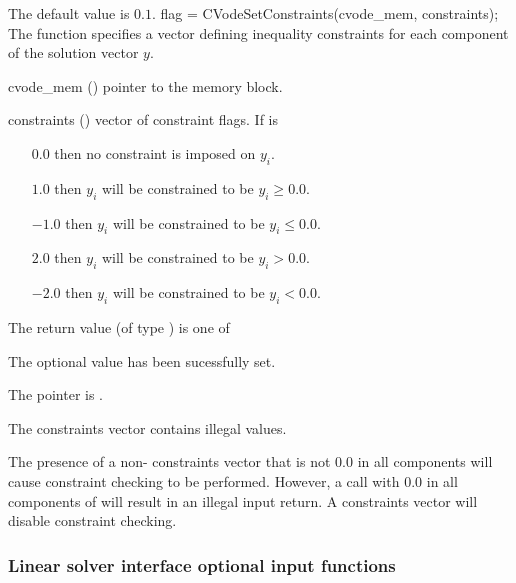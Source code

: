 {
  The default value is $0.1$.
}
{
flag = CVodeSetConstraints(cvode\_mem, constraints);
}
{
  The function  specifies a vector defining
  inequality constraints for each component of the solution vector $y$.
}
{
  \begin{args}
  \item[cvode\_mem] ()
    pointer to the {\cvode} memory block.
  \item[constraints] ()
    vector of constraint flags. If  is
    \begin{itemize}
    \item[$0.0$] then no constraint is imposed on $y_i$.
    \item[$1.0$] then $y_i$ will be constrained to be $y_i \ge 0.0$.
    \item[$-1.0$] then $y_i$ will be constrained to be $y_i \le 0.0$.
    \item[$2.0$] then $y_i$ will be constrained to be $y_i > 0.0$.
    \item[$-2.0$] then $y_i$ will be constrained to be $y_i < 0.0$.
    \end{itemize}
  \end{args}
}
{
  The return value  (of type ) is one of 
  \begin{args}
  \item[\Id{CV\_SUCCESS}]
    The optional value has been sucessfully set.
  \item[\Id{CV\_MEM\_NULL}]
    The  pointer is .
  \item[\Id{CV\_ILL\_INPUT}]
    The constraints vector contains illegal values.
  \end{args}
}
{
  The presence of a non- constraints vector that is not $0.0$ in
  all components will cause constraint checking to be performed.
  However, a call with $0.0$ in all components of  will
  result in an illegal input return. A  constraints vector will disable
  constraint checking.
}

\subsubsection{Linear solver interface optional input functions}
\label{sss:optin_ls}

